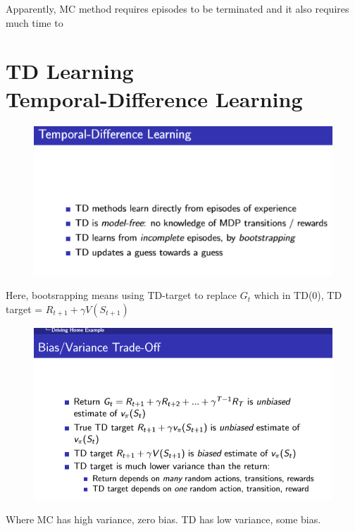\documentclass[12pt, a4paper]{paper}
\begin{document}
Apparently, MC method requires episodes to be terminated and it also requires much time to 


\section{TD Learning \\ Temporal-Difference Learning}
\begin{figure}[h]
	\begin{center}
		\includegraphics[width=\linewidth]{TDlearning.png}
	\end{center}
\end{figure}

Here, bootsrapping means using TD-target to replace $G_{t}$ which in TD(0), TD target = $R_{t+1} + \gamma V(S_{t+1})$

\begin{figure}[h]
	\begin{center}
		\includegraphics[width=\linewidth]{BiasVarianceTradeoff.png}
	\end{center}
\end{figure}
Where MC has high variance, zero bias. TD has low variance, some bias.
\end{document}
